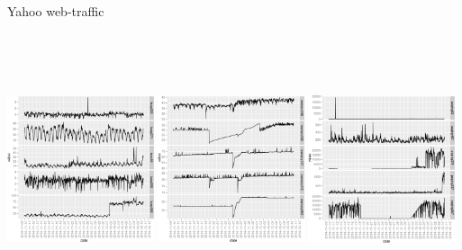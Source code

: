 \documentclass[14pt]{beamer}
\begin{document}
\begin{frame}{Yahoo web-traffic}
\centerline{\includegraphics[width=4.3cm, clip=true, trim=30 10 20 0, height=8cm]{busy_eg.pdf}
\includegraphics[width=4.3cm, clip=true, trim=30 10 20 0, height=8cm]{memory_eg.pdf}
\includegraphics[width=4.3cm, clip=true, trim=30 10 20 0, height=8cm]{page_eg.pdf}}
\end{frame}
\end{document}
